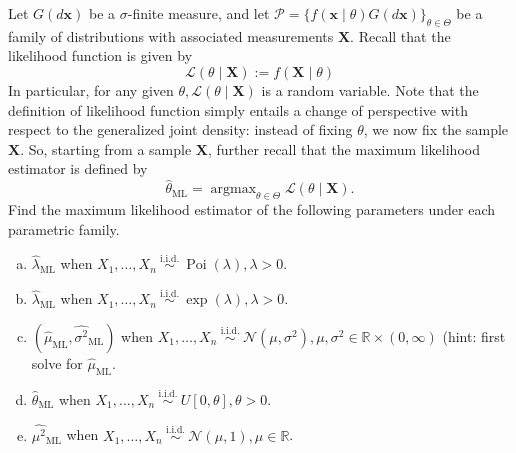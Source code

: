 \begin{ex}
    Let \(G(d \mathbf{x})\) be a \(\sigma\)-finite measure, and let \(\mathcal{P}=\{f(\mathbf{x} \mid \theta) G(d \mathbf{x})\}_{\theta \in \Theta}\) be a family of distributions with associated measurements \(\mathbf{X}\). Recall that the likelihood function is given by
    \[
    \mathcal{L}(\theta \mid \mathbf{X}):=f(\mathbf{X} \mid \theta)
    \]
    In particular, for any given \(\theta, \mathcal{L}(\theta \mid \mathbf{X})\) is a random variable. Note that the definition of likelihood function simply entails a change of perspective with respect to the generalized joint density: instead of fixing \(\theta\), we now fix the sample \(\mathbf{X}\). So, starting from a sample \(\mathbf{X}\), further recall that the maximum likelihood estimator is defined by
    \[
        \widehat{\theta}_{\mathrm{ML}}=\operatorname{argmax}_{\theta \in \Theta} \mathcal{L}(\theta \mid \mathbf{X}) .
    \]
    Find the maximum likelihood estimator of the following parameters under each parametric family. 
    \begin{enumerate}[(a)]
        \item \(\widehat{\lambda}_{\mathrm{ML}}\) when \(X_{1}, \ldots, X_{n} \stackrel{\text { i.i.d. }}{\sim} \operatorname{Poi}(\lambda), \lambda>0\). 
        \item \(\widehat{\lambda}_{\mathrm{ML}}\) when \(X_{1}, \ldots, X_{n} \stackrel{\text { i.i.d. }}{\sim} \exp (\lambda), \lambda>0\). 
        \item \(\left(\widehat{\mu}_{\mathrm{ML}}, \widehat{\sigma^{2}}_\mathrm{ML}\right)\) when \(X_{1}, \ldots, X_{n} \stackrel{\text { i.i.d. }}{\sim} \mathcal{N}\left(\mu, \sigma^{2}\right), \mu, \sigma^{2} \in \mathbb{R} \times(0, \infty)\) (hint: first solve for \(\widehat{\mu}_{\mathrm{ML}}\).
        \item \(\widehat{\theta}_{\mathrm{ML}}\) when \(X_{1}, \ldots, X_{n} \stackrel{\text { i.i.d. }}{\sim} U[0, \theta], \theta>0\). 
        \item \(\widehat{\mu^{2}}{ }_{\mathrm{ML}}\) when \(X_{1}, \ldots, X_{n} \stackrel{\text { i.i.d. }}{\sim} \mathcal{N}(\mu, 1), \mu \in \mathbb{R}\). 
    \end{enumerate}
\end{ex}

